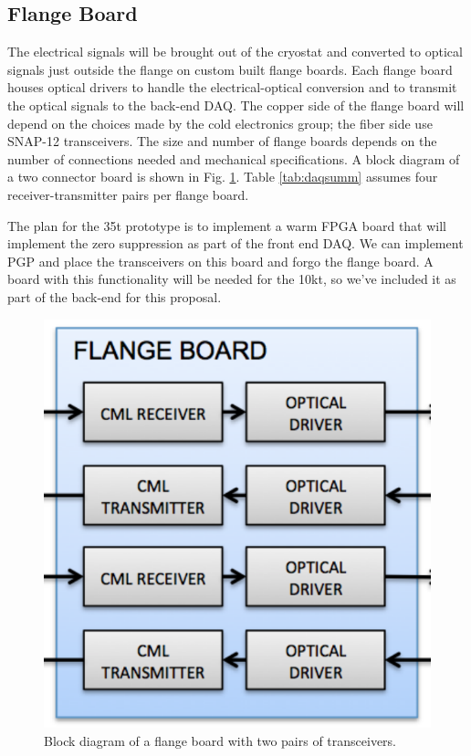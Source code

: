 \subsection{Flange Board}

The electrical signals will be brought out of the cryostat and converted to optical signals just outside the flange on custom built flange boards.   Each flange board houses optical drivers to handle the electrical-optical conversion and to transmit the optical signals to the  back-end DAQ.  The copper side of the flange board will depend on the choices made by the cold electronics group; the fiber side use SNAP-12 transceivers.  The size and number of flange boards depends on the number of connections needed and mechanical specifications.  A block diagram of a two connector board is shown in Fig. \ref{fig:flange}.  Table \ref{tab:daqsumm} assumes four receiver-transmitter pairs per flange board.  

The plan for the 35t prototype is to implement a warm FPGA board that will implement the zero suppression as part of the front end DAQ.  We can implement PGP and place the transceivers on this board and forgo the flange board.  A board with this functionality will be needed for the 10kt, so we've included it as part of the back-end for this proposal.  


\begin{figure}[htb]
\includegraphics[scale=0.6]{flange-board.pdf}
\caption{Block diagram of a flange board with two pairs of transceivers.}
\label{fig:flange}
\end{figure} 

